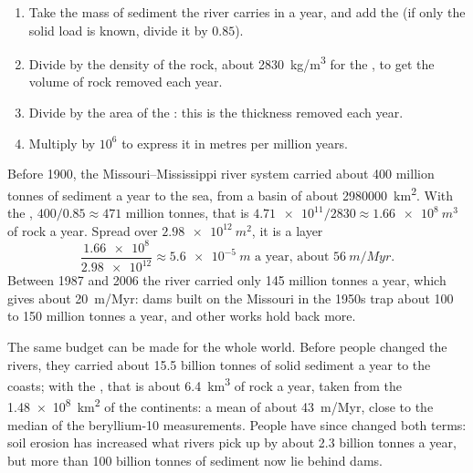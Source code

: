 \begin{method}\label{met:g12:destruction-of-mountains:budget}
\begin{enumerate}
  \item Take the mass of sediment the river carries in a year, and add the
         (if only the solid load is known, divide it by
        $0.85$).
  \item Divide by the density of the rock, about \qty{2830}{kg/m^3} for the
        , to get the volume of rock removed each year.
  \item Divide by the area of the : this is the thickness
        removed each year.
  \item Multiply by $10^6$ to express it in metres per million years.
\end{enumerate}
\end{method}

\begin{example}\label{ex:g12:destruction-of-mountains:mississippi}
Before 1900, the Missouri--Mississippi river system carried about 400
million tonnes of sediment a year to the sea, from a basin of about
\qty{2980000}{km^2}. With the , $400/0.85 \approx 471$ million
tonnes, that is $\num{4.71e11}/2830 \approx \qty{1.66e8}{m^3}$ of rock a year.
Spread over $\qty{2.98e12}{m^2}$, it is a layer
\[
  \frac{\num{1.66e8}}{\num{2.98e12}} \approx \qty{5.6e-5}{m}
  \text{ a year, about } \qty{56}{m/Myr}.
\]
Between 1987 and 2006 the river carried only 145 million tonnes a year, which
gives about \qty{20}{m/Myr}: dams built on the Missouri in the 1950s trap
about 100 to 150 million tonnes a year, and other works hold back more.
\end{example}

The same budget can be made for the whole world. Before people changed the
rivers, they carried about 15.5 billion tonnes of solid sediment a year to
the coasts; with the , that is about \qty{6.4}{km^3} of rock a
year, taken from the \qty{1.48e8}{km^2} of the continents: a mean  of about \qty{43}{m/Myr}, close to the median of the beryllium-10
measurements. People have since changed both terms: soil erosion has
increased what rivers pick up by about 2.3 billion tonnes a year, but more
than 100 billion tonnes of sediment now lie behind dams.

